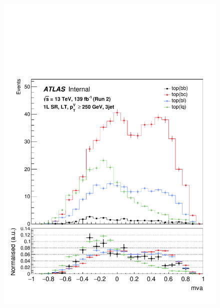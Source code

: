 \begin{figure}[h!]
\vspace{0.5cm}
\center
\includegraphics[scale=0.4]{Images/VH/top/OneLepton_top_2lttag3jet_SR_250ptv_mva.pdf}

\end{figure}
